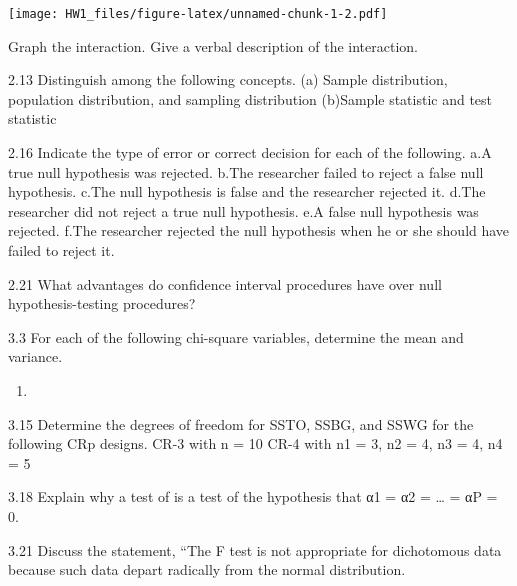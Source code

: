\documentclass[
]{article}
\begin{document}
\texttt{[image: HW1\_files/figure-latex/unnamed-chunk-1-2.pdf]}

Graph the interaction. Give a verbal description of the interaction.

2.13 Distinguish among the following concepts. (a) Sample distribution,
population distribution, and sampling distribution (b)Sample statistic
and test statistic

2.16 Indicate the type of error or correct decision for each of the
following. a.A true null hypothesis was rejected. b.The researcher
failed to reject a false null hypothesis. c.The null hypothesis is false
and the researcher rejected it. d.The researcher did not reject a true
null hypothesis. e.A false null hypothesis was rejected. f.The
researcher rejected the null hypothesis when he or she should have
failed to reject it.

2.21 What advantages do confidence interval procedures have over null
hypothesis-testing procedures?

3.3 For each of the following chi-square variables, determine the mean
and variance.

\begin{enumerate}
\def\labelenumi{\alph{enumi}.}
\item
\end{enumerate}

3.15 Determine the degrees of freedom for SSTO, SSBG, and SSWG for the
following CRp designs. CR-3 with n = 10 CR-4 with n1 = 3, n2 = 4, n3 =
4, n4 = 5

3.18 Explain why a test of is a test of the hypothesis that α1 = α2 =
\ldots{} = αP = 0.

3.21 Discuss the statement, ``The F test is not appropriate for
dichotomous data because such data depart radically from the normal
distribution.
\end{document}
